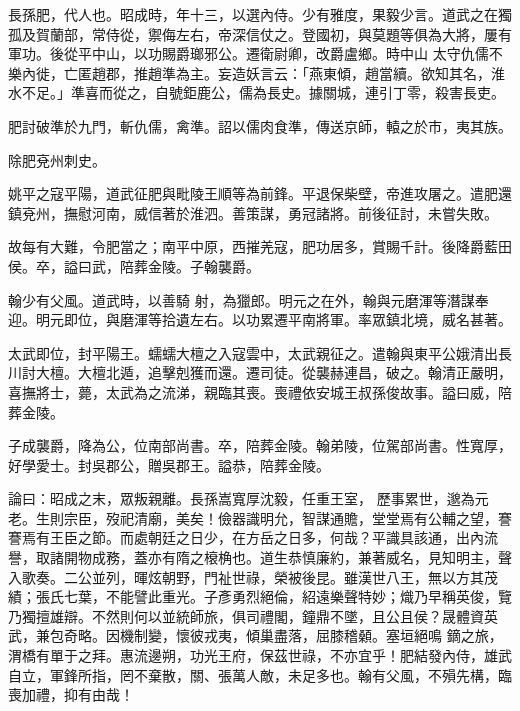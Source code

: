 \begin{pinyinscope}
 長孫肥，代人也。昭成時，年十三，以選內侍。少有雅度，果毅少言。道武之在獨孤及賀蘭部，常侍從，禦侮左右，帝深信仗之。登國初，與莫題等俱為大將，屢有軍功。後從平中山，以功賜爵瑯邪公。遷衛尉卿，改爵盧鄉。時中山
 太守仇儒不樂內徙，亡匿趙郡，推趙準為主。妄造妖言云：「燕東傾，趙當續。欲知其名，淮水不足。」準喜而從之，自號鉅鹿公，儒為長史。據關城，連引丁零，殺害長吏。



 肥討破準於九門，斬仇儒，禽準。詔以儒肉食準，傳送京師，轅之於市，夷其族。



 除肥兗州刺史。



 姚平之寇平陽，道武征肥與毗陵王順等為前鋒。平退保柴壁，帝進攻屠之。遣肥還鎮兗州，撫慰河南，威信著於淮泗。善策謀，勇冠諸將。前後征討，未嘗失敗。



 故每有大難，令肥當之；南平中原，西摧羌寇，肥功居多，賞賜千計。後降爵藍田侯。卒，謚曰武，陪葬金陵。子翰襲爵。



 翰少有父風。道武時，以善騎
 射，為獵郎。明元之在外，翰與元磨渾等潛謀奉迎。明元即位，與磨渾等拾遺左右。以功累遷平南將軍。率眾鎮北境，威名甚著。



 太武即位，封平陽王。蠕蠕大檀之入寇雲中，太武親征之。遣翰與東平公娥清出長川討大檀。大檀北遁，追擊剋獲而還。遷司徒。從襲赫連昌，破之。翰清正嚴明，喜撫將士，薨，太武為之流涕，親臨其喪。喪禮依安城王叔孫俊故事。謚曰威，陪葬金陵。



 子成襲爵，降為公，位南部尚書。卒，陪葬金陵。翰弟陵，位駕部尚書。性寬厚，好學愛士。封吳郡公，贈吳郡王。謚恭，陪葬金陵。



 論曰：昭成之末，眾叛親離。長孫嵩寬厚沈毅，任重王室，
 歷事累世，邈為元老。生則宗臣，歿祀清廟，美矣！儉器識明允，智謀通贍，堂堂焉有公輔之望，謇謇焉有王臣之節。而處朝廷之日少，在方岳之日多，何哉？平識具該通，出內流譽，取諸開物成務，蓋亦有隋之榱桷也。道生恭慎廉約，兼著威名，見知明主，聲入歌奏。二公並列，暉炫朝野，門祉世祿，榮被後昆。雖漢世八王，無以方其茂績；張氏七葉，不能譬此重光。子彥勇烈絕倫，紹遠樂聲特妙；熾乃早稱英俊，覽乃獨擅雄辯。不然則何以並統師旅，俱司禮閣，鐘鼎不墜，且公且侯？晟體資英武，兼包奇略。因機制變，懷彼戎夷，傾巢盡落，屈膝稽顙。塞垣絕鳴
 鏑之旅，渭橋有單于之拜。惠流邊朔，功光王府，保茲世祿，不亦宜乎！肥結發內侍，雄武自立，軍鋒所指，罔不棄散，關、張萬人敵，未足多也。翰有父風，不殞先構，臨喪加禮，抑有由哉！



\end{pinyinscope}